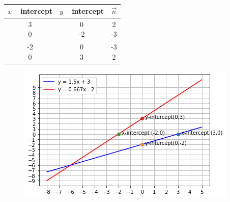 \begin{table}[htbp]
	\centering
	\begin{tabular}{|c|c|c|} \hline 
	$x-$intercept & $y-$intercept & \quad $\vec{n}$  \\ \hline \hline
	\myvec{3\\0}	&	\myvec{0\\-2}	&	\myvec{2\\-3} \\ \hline
	\myvec{-2\\0}	&	\myvec{0\\3}	&	\myvec{-3\\2} \\ \hline
	\end{tabular}
	\caption{} \label{coeftable}
\end{table}
\begin{figure}[!h]
\includegraphics[width=\columnwidth]{./solutions/line_plane/45/stline_plot.png}
	\caption{}  \label{linefig1:solutions/line_plane_45/} 
\end{figure}

